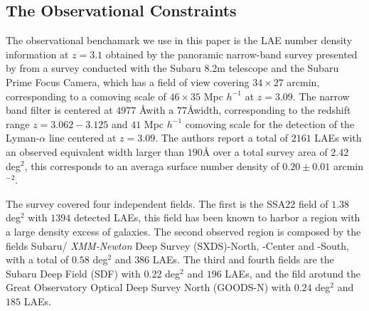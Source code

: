 \documentclass[usenatbib]{mn2e}
\newcommand{\hMsun}{{\ifmmode{h^{-1}{\rm {M_{\odot}}}}\else{$h^{-1}{\rm{M_{\odot}}}$}\fi}}
\begin{document}



\subsection{The Observational Constraints}

The observational benchamark we use in this paper is the LAE number
density information at $z=3.1$ obtained by the panoramic narrow-band
survey presented by \cite{Yamada2012} from a survey 
conducted with the Subaru 8.2m telescope and the Subaru Prime
Focus Camera, which has a field of view covering $34\times 27$ arcmin,
corresponding to a comoving scale of $46\times35$ Mpc $h^{-1}$ at
$z=3.09$. The narrow band filter is centered at $4977$ \AA with a
$77$\AA width, corresponding to the redshift range $z=3.062-3.125$ and
$41$ Mpc $h^{-1}$ comoving scale for the detection of the
Lyman-$\alpha$ line centered at $z=3.09$. The authors report a total of
$2161$ LAEs with an observed equivalent width larger than $190$\AA
over a total survey area of $2.42$ deg$^{2}$, this corresponds to an
averaga surface number density of $0.20\pm 0.01$ arcmin$^{-2}$.  

The survey covered four independent fields. The first is the SSA22
field of $1.38$ deg$^2$ with $1394$ detected LAEs, this field has been
known to harbor a region with a large density excess of galaxies. The
second observed region is composed by the fields Subaru/{\it
  XMM-Newton} Deep Survey (SXDS)-North, -Center and -South, with a 
total of $0.58$ deg$^2$ and $386$ LAEs. The third and fourth fields
are the Subaru Deep Field (SDF) with $0.22$ deg$^2$ and $196$ LAEs,
and the fild arotund the Great Observatory Optical Deep Survey North
(GOODS-N) with $0.24$ deg$^2$ and $185$ LAEs. 
\end{document}
